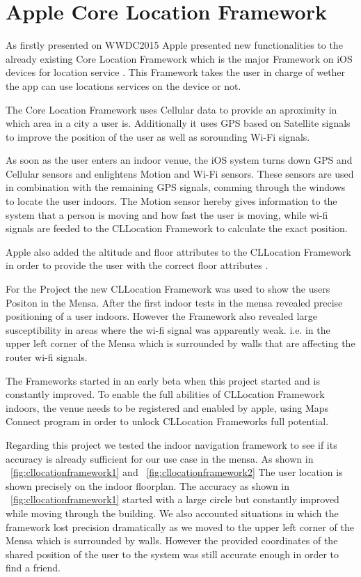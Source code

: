 \vspace{0.5cm}

\section{Apple Core Location Framework}

As firstly presented on WWDC2015 \cite{wwdc15}  Apple presented new functionalities to the already existing Core Location Framework which is the major Framework on iOS devices for location service \cite{CLlocation}. This Framework takes the user in charge of wether the app can use locations services on the device or not.

The Core Location Framework uses Cellular data to provide an aproximity in which area in a city a user is. Additionally it uses GPS based on Satellite signals to improve the position of the user as well as sorounding Wi-Fi signals.

As soon as the user enters an indoor venue, the iOS system turns down GPS and Cellular sensors and enlightens Motion and Wi-Fi sensors.
These sensors are used in combination with the remaining GPS signals, comming through the windows to locate the user indoors. The Motion sensor hereby gives information to the system that a person is moving and how fast the user is moving, while wi-fi signals are feeded to the CLLocation Framework to calculate the exact position.

Apple also added the altitude and floor attributes to the CLLocation Framework in order to provide the user with the correct floor attributes \cite{CLlocation}.

For the Project the new CLLocation Framework was used to show the users Positon in the Mensa. After the first indoor tests in the mensa revealed precise positioning of a user indoors. However the Framework also revealed large susceptibility in areas where the wi-fi signal was apparently weak. i.e. in the upper left corner of the Mensa which is surrounded by walls that are affecting the router wi-fi signals.

The Frameworks started in an early beta when this project started and is constantly improved. To enable the full abilities of CLLocation Framework indoors, the venue needs to be registered and enabled by apple, using Maps Connect program \cite{mapsConnect} in order to unlock CLLocation Frameworks full potential.

Regarding this project we tested the indoor navigation framework to see if its accuracy is already sufficient for our use case in the mensa. As shown in  ~\ref{fig:cllocationframework1} and ~\ref{fig:cllocationframework2} The user location is shown precisely on the indoor floorplan. The accuracy as shown in ~\ref{fig:cllocationframework1} started with a large circle but constantly improved while moving through the building. We also accounted situations in which the framework lost precision dramatically as we moved to the upper left corner of the Mensa which is surrounded by walls. However the provided coordinates of the shared position of the user to the system was still accurate enough in order to find a friend.

